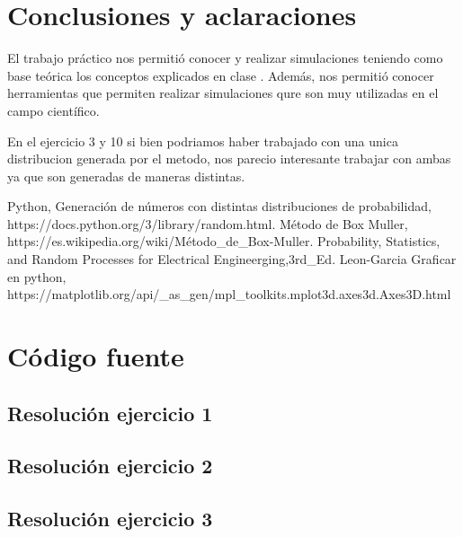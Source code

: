 \documentclass[11pt,a4paper]{article}
\begin{document}
\newpage
\section{Conclusiones y aclaraciones}
El trabajo práctico nos permitió conocer y realizar simulaciones teniendo como base teórica los conceptos explicados en clase . Además, nos permitió conocer herramientas que permiten realizar simulaciones qure son muy utilizadas en el campo científico.

En el ejercicio 3 y 10 si bien podriamos haber trabajado con una unica distribucion generada por el metodo, nos parecio interesante trabajar con ambas ya que son generadas de maneras distintas.
\begin{thebibliography}{10}
	\bibitem{} Python, Generación de números con distintas distribuciones de probabilidad, https://docs.python.org/3/library/random.html.
	\bibitem{} Método de Box Muller, https://es.wikipedia.org/wiki/Método\_de\_Box-Muller.
	\bibitem{} Probability, Statistics, and Random Processes for Electrical Engineerging,3rd\_Ed. Leon-Garcia
	\bibitem{} Graficar en python, https://matplotlib.org/api/\_as\_gen/mpl\_toolkits.mplot3d.axes3d.Axes3D.html
\end{thebibliography}


\newpage
\appendix
\section{Código fuente}\label{appendix_codigo_fuente}

	\subsection{Resolución ejercicio 1}\label{ejercicio_1}
		

	\newpage

	\subsection{Resolución ejercicio 2}\label{ejercicio_2}
		

	\newpage

	\subsection{Resolución ejercicio 3}\label{ejercicio_3}
		
\end{document}
